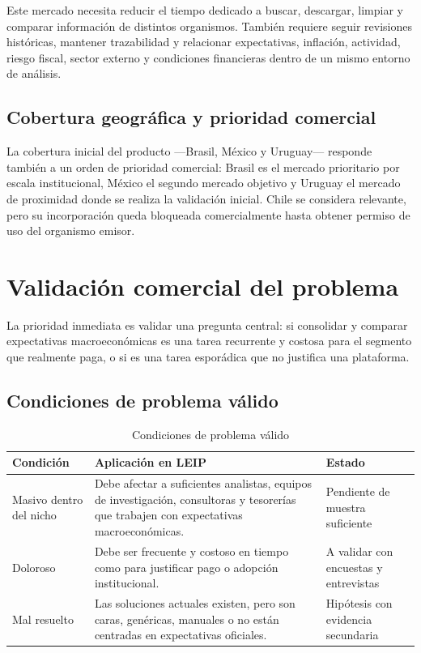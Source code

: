 \documentclass[11pt,a4paper]{article}
\newcommand{\proyectoNombre}{LEIP}
\begin{document}
Este mercado necesita reducir el tiempo dedicado a buscar, descargar, limpiar y
comparar informaci\'on de distintos organismos. Tambi\'en requiere seguir
revisiones hist\'oricas, mantener trazabilidad y relacionar expectativas,
inflaci\'on, actividad, riesgo fiscal, sector externo y condiciones financieras
dentro de un mismo entorno de an\'alisis.

\subsection{Cobertura geogr\'afica y prioridad comercial}

La cobertura inicial del producto ---Brasil, M\'exico y Uruguay--- responde
tambi\'en a un orden de prioridad comercial: Brasil es el mercado prioritario
por escala institucional, M\'exico el segundo mercado objetivo y Uruguay el
mercado de proximidad donde se realiza la validaci\'on inicial. Chile se
considera relevante, pero su incorporaci\'on queda bloqueada comercialmente
hasta obtener permiso de uso del organismo emisor.

\section{Validaci\'on comercial del problema}
\label{sec:validacion}

La prioridad inmediata es validar una pregunta central: si consolidar y comparar
expectativas macroecon\'omicas es una tarea recurrente y costosa para el
segmento que realmente paga, o si es una tarea espor\'adica que no justifica una
plataforma.

\subsection{Condiciones de problema v\'alido}

\begin{table}[htbp]
\centering
\caption{Condiciones de problema v\'alido}
\label{tab:validez}
\begin{tabularx}{\textwidth}{l X l}
\toprule
\textbf{Condici\'on} & \textbf{Aplicaci\'on en \proyectoNombre{}} & \textbf{Estado} \\
\midrule
Masivo dentro del nicho &
Debe afectar a suficientes analistas, equipos de investigaci\'on, consultoras y
tesorer\'ias que trabajen con expectativas macroecon\'omicas. &
Pendiente de muestra suficiente \\
\addlinespace
Doloroso &
Debe ser frecuente y costoso en tiempo como para justificar pago o adopci\'on
institucional. &
A validar con encuestas y entrevistas \\
\addlinespace
Mal resuelto &
Las soluciones actuales existen, pero son caras, gen\'ericas, manuales o no
est\'an centradas en expectativas oficiales. &
Hip\'otesis con evidencia secundaria \\
\bottomrule
\end{tabularx}
\end{table}
\end{document}
